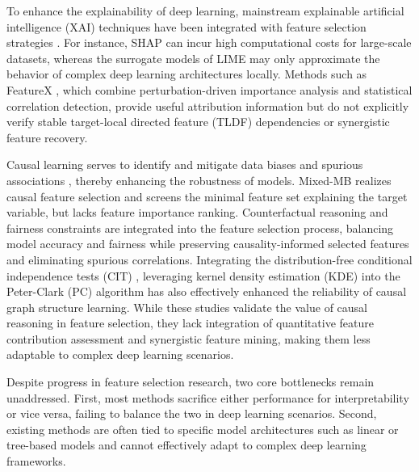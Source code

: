 \documentclass[journal]{IEEEtran}
\begin{document}
To enhance the explainability of deep learning, mainstream explainable artificial intelligence (XAI) techniques have been integrated with feature selection strategies \cite{cohen2007feature}. For instance, SHAP \cite{lundberg2017unified} can incur high computational costs for large-scale datasets, whereas the surrogate models of LIME \cite{ribeiro2016why} may only approximate the behavior of complex deep learning architectures locally. Methods such as FeatureX \cite{liang2025featurex}, which combine perturbation-driven importance analysis and statistical correlation detection, provide useful attribution information but do not explicitly verify stable target-local directed feature (TLDF) dependencies or synergistic feature recovery.

Causal learning serves to identify and mitigate data biases and spurious associations \cite{wang-etal-2021-enhancing}, thereby enhancing the robustness of models. Mixed-MB \cite{lee2020markov} realizes causal feature selection and screens the minimal feature set explaining the target variable, but lacks feature importance ranking. Counterfactual reasoning and fairness constraints \cite{kusner2017counterfactual} are integrated into the feature selection process, balancing model accuracy and fairness while preserving causality-informed selected features and eliminating spurious correlations. Integrating the distribution-free conditional independence tests (CIT) \cite{cai2022cit}, leveraging kernel density estimation (KDE) \cite{wei2025kde} into the Peter-Clark (PC) \cite{spirtes2000causation} algorithm has also effectively enhanced the reliability of causal graph structure learning. While these studies validate the value of causal reasoning in feature selection, they lack integration of quantitative feature contribution assessment and synergistic feature mining, making them less adaptable to complex deep learning scenarios.


Despite progress in feature selection research, two core bottlenecks remain unaddressed. First, most methods sacrifice either performance for interpretability or vice versa, failing to balance the two in deep learning scenarios. Second, existing methods are often tied to specific model architectures such as linear or tree-based models and cannot effectively adapt to complex deep learning frameworks.
\end{document}
